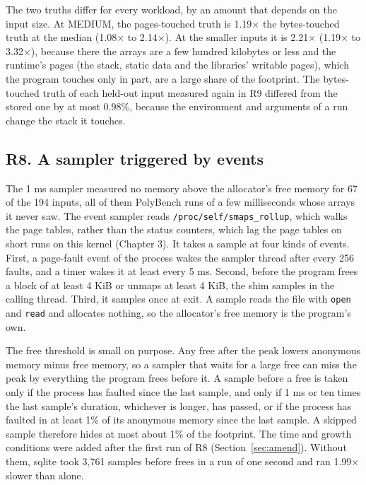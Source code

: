 \documentclass[11pt]{article}
\begin{document}
The two truths differ for every workload, by an amount that depends on the input size. At MEDIUM, the
pages-touched truth is 1.19$\times$ the bytes-touched truth at the median (1.08$\times$ to 2.14$\times$). At the
smaller inputs it is 2.21$\times$ (1.19$\times$ to 3.32$\times$), because there the arrays are a few hundred
kilobytes or less and the runtime's pages (the stack, static data and the libraries' writable pages), which the
program touches only in part, are a large share of the footprint. The bytes-touched truth of each held-out input
measured again in R9 differed from the stored one by at most 0.98\%, because the environment and arguments of a run
change the stack it touches.

\subsection{R8. A sampler triggered by events}
\label{sec:r8}

The 1 ms sampler measured no memory above the allocator's free memory for 67 of the 194 inputs, all of them
PolyBench runs of a few milliseconds whose arrays it never saw. The event sampler reads
\texttt{/proc/self/smaps\_rollup}, which walks the page tables, rather than the status counters, which lag the page
tables on short runs on this kernel (Chapter 3). It takes a sample at four kinds of events. First, a page-fault
event of the process wakes the sampler thread after every 256 faults, and a timer wakes it at least every 5 ms.
Second, before the program frees a block of at least 4 KiB or unmaps at least 4 KiB, the shim samples in the
calling thread. Third, it samples once at exit. A sample reads the file with \texttt{open} and \texttt{read} and
allocates nothing, so the allocator's free memory is the program's own.

The free threshold is small on purpose. Any free after the peak lowers anonymous memory minus free memory, so a
sampler that waits for a large free can miss the peak by everything the program frees before it. A sample before a
free is taken only if the process has faulted since the last sample, and only if 1 ms or ten times the last
sample's duration, whichever is longer, has passed, or if the process has faulted in at least 1\% of its anonymous
memory since the last sample. A skipped sample therefore hides at most about 1\% of the footprint. The time and
growth conditions were added after the first run of R8 (Section~\ref{sec:amend}). Without them, sqlite took 3,761
samples before frees in a run of one second and ran 1.99$\times$ slower than alone.
\end{document}

